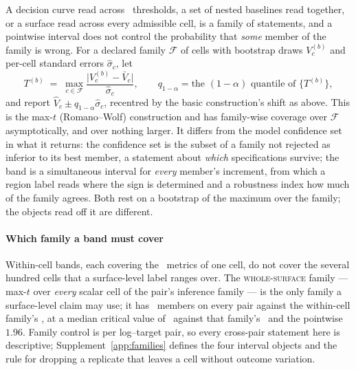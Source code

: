 A decision curve read across \nGrid\ thresholds, a set of nested baselines
read together, or a surface read across every admissible cell, is a family of
statements, and a pointwise interval does not control the probability that
\emph{some} member of the family is wrong. For a declared family
$\mathcal{F}$ of cells with bootstrap draws $V^{(b)}_c$ and per-cell standard
errors $\hat\sigma_c$, let
\[
T^{(b)} \;=\; \max_{c \in \mathcal{F}}
\frac{\bigl|V^{(b)}_c - \bar{V}_c\bigr|}{\hat\sigma_c},
\qquad
q_{1-\alpha} = \text{the } (1-\alpha)\text{ quantile of } \{T^{(b)}\},
\]
and report $\hat{V}_c \pm q_{1-\alpha}\hat\sigma_c$, recentred by the basic
construction's shift as above. This is the max-$t$
(Romano--Wolf) construction \citep{romano2005stepdown} and has family-wise
coverage over $\mathcal{F}$ asymptotically, and over nothing larger. It
differs from the model confidence set \citep{hansen2011mcs} in what it
returns: the confidence set is the subset of a family not rejected as
inferior to its best member, a statement about \emph{which} specifications
survive; the band is a simultaneous interval for \emph{every} member's
increment, from which a region label reads where the sign is determined and
a robustness index how much of the family agrees. Both rest on a bootstrap
of the maximum over the family; the objects read off it are different.

\paragraph{Which family a band must cover}
Within-cell bands, each covering the \nInstruments\ metrics of one cell, do
not cover the several hundred cells that a surface-level label ranges over.
The \textsc{whole-surface} family --- max-$t$ over \emph{every} scalar cell
of the pair's inference family --- is the only family a surface-level claim
may use; it has \familySizeMedian\ members on every pair against the within-cell
family's \nInstruments, at a median critical value of \maxTSurfaceMedian\
against that family's \maxTWithinMedian\ and the pointwise $1.96$. Family
control is per log--target pair, so every cross-pair statement here is
descriptive; Supplement~\ref{app:families} defines the four interval objects
and the rule for dropping a replicate that leaves a cell without outcome
variation.

